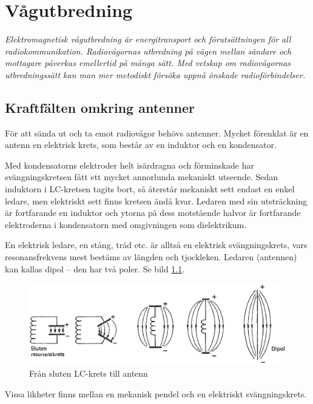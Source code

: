 \chapter{Vågutbredning}
\label{vågutbredning}

\emph{Elektromagnetisk vågutbredning är energitransport och
  förutsättningen för all radiokommunikation. Radiovågornas utbredning
  på vägen mellan sändare och mottagare påverkas emellertid på många
  sätt. Med vetskap om radiovågornas utbredningssätt kan man mer
  metodiskt försöka uppnå önskade radioförbindelser.}

\section[Kraftfält antenner]{Kraftfälten omkring antenner}

För att sända ut och ta emot radiovågor behövs antenner. Mycket
förenklat är en antenn en elektrisk krets, som består av en induktor
och en kondensator.

Med kondensatorns elektroder helt isärdragna och förminskade har
svängningskretsen fått ett mycket annorlunda mekaniskt utseende. Sedan
induktorn i LC-kretsen tagits bort, så återstår mekaniskt sett endast
en enkel ledare, men elektriskt sett finns kretsen ändå kvar. Ledaren
med sin utsträckning är fortfarande en induktor och ytorna på dess
motstående halvor är fortfarande elektroderna i kondensatorn med
omgivningen som dielektrikum.

En elektrisk ledare, en stång, tråd etc. är alltså en elektrisk
svängningskrets, vars resonansfrekvens mest bestäms av längden och
tjockleken. Ledaren (antennen) kan kallas dipol -- den har två
poler. Se bild \ref{fig:BildII7-01}.

\begin{figure}
\includegraphics[width=\textwidth]{images/cropped_pdfs/bild_2_7-01.pdf}
\caption{Från sluten LC-krets till antenn}
\label{fig:BildII7-01}
\end{figure}

Vissa likheter finns mellan en mekanisk pendel och en elektriskt
svängningskrets.

